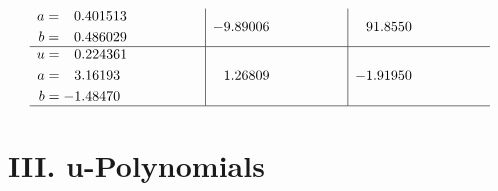 \documentclass[1p]{elsarticle_modified}
\theoremstyle{definition}
\begin{document}
$$\begin{array}{c|c|c}
\begin{aligned}
a &= \phantom{-}0.401513\phantom{ +0.000000I} \\
b &= \phantom{-}0.486029\phantom{ +0.000000I}\end{aligned}
 & -9.89006\phantom{ +0.000000I} & \phantom{-}91.8550\phantom{ +0.000000I} \\ \hline\begin{aligned}
u &= \phantom{-}0.224361\phantom{ +0.000000I} \\
a &= \phantom{-}3.16193\phantom{ +0.000000I} \\
b &= -1.48470\phantom{ +0.000000I}\end{aligned}
 & \phantom{-}1.26809\phantom{ +0.000000I} & -1.91950\phantom{ +0.000000I}\\
 \hline 
 \end{array}$$\newpage
\newpage\renewcommand{\arraystretch}{1}
\centering \section*{ III. u-Polynomials}
\end{document}
